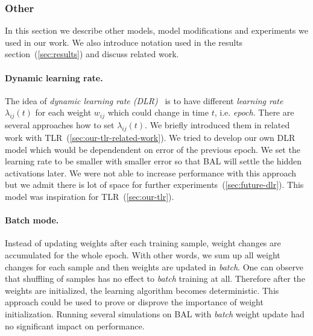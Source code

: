 \subsubsection{Other}

In this section we describe other models, model modifications and experiments we used in our work. We also introduce notation used in the results section~(\ref{sec:results}) and discuss related work. 

\paragraph{Dynamic learning rate.} 
\label{sec:our-dynamic-lambda} 
The idea of \emph{dynamic learning rate (DLR)}~\citep{jacobs1988increased} is to have different \emph{learning rate} $\lambda_{ij}(t)$ for each weight $w_{ij}$ which could change in time $t$, i.e. \emph{epoch}. There are several approaches how to set $\lambda_{ij}(t)$. We briefly introduced them in related work with TLR~(\ref{sec:our-tlr-related-work}). We tried to develop our own DLR model which would be dependendent on error of the previous epoch. We set the learning rate to be smaller with smaller error so that BAL will settle the hidden activations later. We were not able to increase performance with this approach but we admit there is lot of space for further experiments~(\ref{sec:future-dlr}). This model was inspiration for TLR~(\ref{sec:our-tlr}). 




\paragraph{Batch mode.} Instead of updating weights after each training sample, weight changes are accumulated for the whole epoch. With other words, we sum up all weight changes for each sample and then weights are updated in \emph{batch}. One can observe that shuffling of samples has no effect to \emph{batch} training at all. Therefore after the weights are initialized, the learning algorithm becomes deterministic. This approach could be used to prove or disprove the importance of weight initialization. Running several simulations on BAL with \emph{batch} weight update had no significant impact on performance. 


